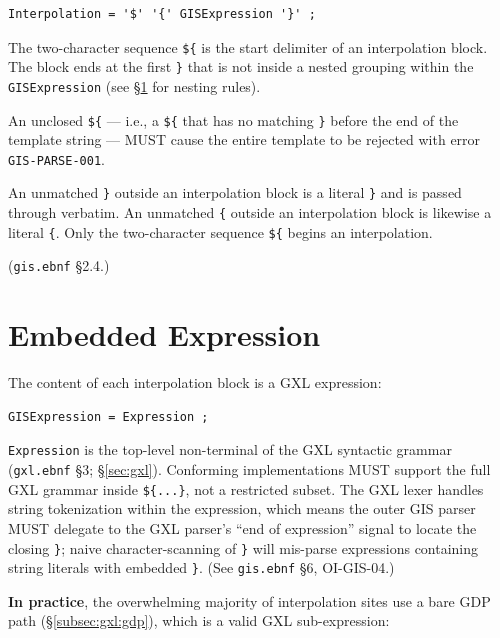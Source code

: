 \begin{verbatim}
Interpolation = '$' '{' GISExpression '}' ;
\end{verbatim}

The two-character sequence \texttt{\$\{} is the start delimiter of an
interpolation block.
The block ends at the first \texttt{\}} that is not inside a nested
grouping within the \texttt{GISExpression}
(see \S\ref{sec:gis:expression} for nesting rules).

An unclosed \texttt{\$\{} — i.e., a \texttt{\$\{} that has no matching
\texttt{\}} before the end of the template string — MUST cause the
entire template to be rejected with error \texttt{GIS-PARSE-001}.

An unmatched \texttt{\}} outside an interpolation block is a literal
\texttt{\}} and is passed through verbatim.
An unmatched \texttt{\{} outside an interpolation block is likewise
a literal \texttt{\{}.
Only the two-character sequence \texttt{\$\{} begins an interpolation.

(\texttt{gis.ebnf} \S2.4.)

\section{Embedded Expression}
\label{sec:gis:expression}

The content of each interpolation block is a GXL expression:

\begin{verbatim}
GISExpression = Expression ;
\end{verbatim}

\texttt{Expression} is the top-level non-terminal of the GXL syntactic
grammar (\texttt{gxl.ebnf} \S3; \S\ref{sec:gxl}).
Conforming implementations MUST support the full GXL grammar inside
\texttt{\$\{...\}}, not a restricted subset.
The GXL lexer handles string tokenization within the expression, which
means the outer GIS parser MUST delegate to the GXL parser's
``end of expression'' signal to locate the closing \texttt{\}};
naive character-scanning of \texttt{\}} will mis-parse expressions
containing string literals with embedded \texttt{\}}.
(See \texttt{gis.ebnf} \S6, OI-GIS-04.)

\noindent\textbf{In practice}, the overwhelming majority of interpolation
sites use a bare GDP path (\S\ref{subsec:gxl:gdp}), which is a valid
GXL sub-expression:

